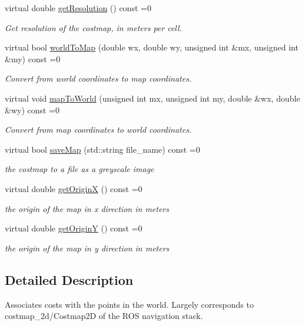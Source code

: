 \begin{DoxyCompactItemize}
virtual double \hyperlink{classquadtree__planner_1_1Costmap_aaef2845def8e7320a7fa576e9efab289}{get\+Resolution} () const =0
\begin{DoxyCompactList}\small\item\em Get resolution of the costmap, in meters per cell. \end{DoxyCompactList}\item 
virtual bool \hyperlink{classquadtree__planner_1_1Costmap_aba601c58933da74c707214d4dba2925a}{world\+To\+Map} (double wx, double wy, unsigned int \&mx, unsigned int \&my) const =0
\begin{DoxyCompactList}\small\item\em Convert from world coordinates to map coordinates. \end{DoxyCompactList}\item 
virtual void \hyperlink{classquadtree__planner_1_1Costmap_af82ccc7c15bd2cb9092e002ac6998eba}{map\+To\+World} (unsigned int mx, unsigned int my, double \&wx, double \&wy) const =0
\begin{DoxyCompactList}\small\item\em Convert from map coordinates to world coordinates. \end{DoxyCompactList}\item 
virtual bool \hyperlink{classquadtree__planner_1_1Costmap_ad6251247260f19389a1fa547c9b0d956}{save\+Map} (std\+::string file\+\_\+name) const =0
\begin{DoxyCompactList}\small\item\em the costmap to a file as a greyscale image \end{DoxyCompactList}\item 
virtual double \hyperlink{classquadtree__planner_1_1Costmap_a8fda39ff20cf58f6700705dae7bd3a0b}{get\+OriginX} () const =0
\begin{DoxyCompactList}\small\item\em the origin of the map in x direction in meters \end{DoxyCompactList}\item 
virtual double \hyperlink{classquadtree__planner_1_1Costmap_aa2b342e257504329321109b1822ca302}{get\+OriginY} () const =0
\begin{DoxyCompactList}\small\item\em the origin of the map in y direction in meters \end{DoxyCompactList}\end{DoxyCompactItemize}


\subsection{Detailed Description}
Associates costs with the points in the world. Largely corresponds to costmap\+\_\+2d/\+Costmap2D of the R\+OS navigation stack. 

